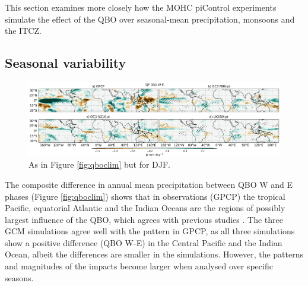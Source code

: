 
This section examines more closely how the MOHC piControl experiments simulate the effect of the QBO over seasonal-mean precipitation, monsoons and the ITCZ. 



\subsection{Seasonal variability}

\begin{figure}[t!]
\centering
 \includegraphics[width=\linewidth]{figures/piprdjfqbowqboe.png}
\caption[DJF mean precipitation composite difference QBO W-E ]{ As in Figure \ref{fig:qboclim} but for DJF. }
\label{fig:qbodjf}
\end{figure}

The composite difference in annual mean precipitation between QBO W and E phases (Figure \ref{fig:qboclim}) shows that in observations (GPCP) the tropical Pacific, equatorial Atlantic and the Indian Oceans are the regions of possibly largest influence of the QBO, which agrees with previous studies \citep{liess2012,gray2018}. The three GCM simulations agree well with the pattern in GPCP, as all three simulations show a positive difference (QBO W-E) in the Central Pacific and the Indian Ocean, albeit the differences are smaller in the simulations. However, the patterns and magnitudes of the impacts become larger when analysed over specific seasons. %

